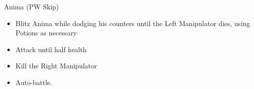 \begin{multicols}{2}
\begin{battle}{Anima (PW Skip)}

\begin{itemize}
    \item Blitz Anima while dodging his counters until the Left Manipulator dies, using Potions as necessary
    \item Attack until half health
    \item Kill the Right Manipulator
    \item Auto-battle.
\end{itemize}
\end{battle}



\end{multicols}
